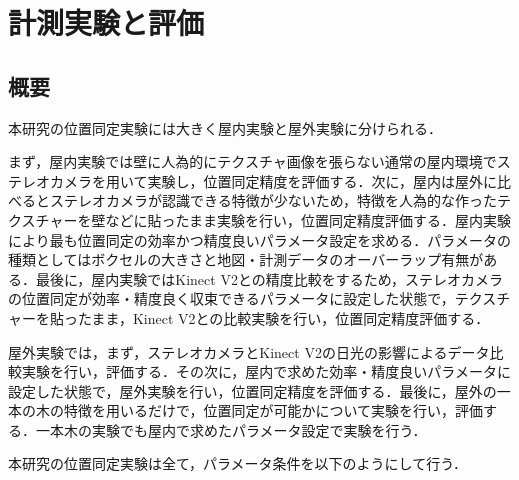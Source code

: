 \chapter{計測実験と評価}
\section{概要}
本研究の位置同定実験には大きく屋内実験と屋外実験に分けられる．\par
まず，屋内実験では壁に人為的にテクスチャ画像を張らない通常の屋内環境でステレオカメラを用いて実験し，位置同定精度を評価する．次に，屋内は屋外に比べるとステレオカメラが認識できる特徴が少ないため，特徴を人為的な作ったテクスチャーを壁などに貼ったまま実験を行い，位置同定精度評価する．屋内実験により最も位置同定の効率かつ精度良いパラメータ設定を求める．パラメータの種類としてはボクセルの大きさと地図・計測データのオーバーラップ有無がある．最後に，屋内実験ではKinect V2との精度比較をするため，ステレオカメラの位置同定が効率・精度良く収束できるパラメータに設定した状態で，テクスチャーを貼ったまま，Kinect V2との比較実験を行い，位置同定精度評価する．\par
屋外実験では，まず，ステレオカメラとKinect V2の日光の影響によるデータ比較実験を行い，評価する．その次に，屋内で求めた効率・精度良いパラメータに設定した状態で，屋外実験を行い，位置同定精度を評価する．最後に，屋外の一本の木の特徴を用いるだけで，位置同定が可能かについて実験を行い，評価する．一本木の実験でも屋内で求めたパラメータ設定で実験を行う．

\newpage

本研究の位置同定実験は全て，パラメータ条件を以下のようにして行う．

